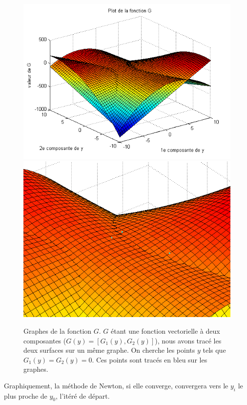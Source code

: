 \begin{figure}
\centering
\includegraphics[width=12cm]{grapheG.png}\\
\includegraphics[width=12cm]{grapheG2.png}
\caption{Graphes de la fonction $G$. $G$ étant une fonction vectorielle à deux composantes ($G(y)=[G_1(y), G_2(y)]$), nous avons tracé les deux surfaces sur un même graphe. On cherche les points $y$ tels que $G_1(y)=G_2(y)=0$. Ces points sont tracés en bleu sur les graphes.}
\label{grapheG}
\end{figure}
Graphiquement, la méthode de Newton, si elle converge, convergera vers le $y_i$ le plus proche de $y_0$, l'itéré de départ.\\

